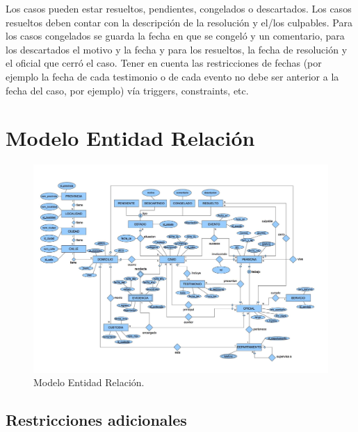 \documentclass[11pt, a4paper]{article}
\begin{document}
\par Los casos pueden estar resueltos, pendientes, congelados o descartados. Los casos resueltos deben contar con la descripción de la resolución y el/los culpables. Para los casos congelados se guarda la fecha en que se congeló y un comentario, para los descartados el motivo y la fecha y para los resueltos, la fecha de resolución y el oficial que cerró el caso. Tener en cuenta las restricciones de fechas (por ejemplo la fecha de cada testimonio o de cada evento no debe ser anterior a la fecha del caso, por ejemplo) vía triggers, constraints, etc.

\newpage
\section{Modelo Entidad Relación}

\begin{figure}[H]
  \includegraphics[angle=90, width=\linewidth]{figuras/DER.jpg}
  \caption{Modelo Entidad Relación.}
  \label{fig:MER}
\end{figure}

\subsection{Restricciones adicionales}
\end{document}
